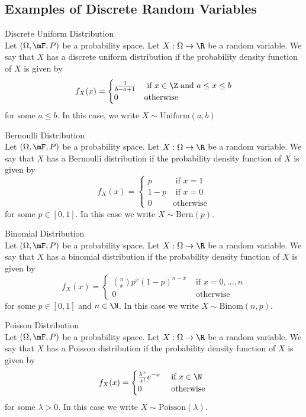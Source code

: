 \documentclass[a4paper]{article}
\begin{document}
\subsection{Examples of Discrete Random Variables}
\begin{defn}{Discrete Uniform Distribution}{}\\
Let $(\Omega,\mF,P)$ be a probability space. Let $X:\Omega\to\R$ be a random variable. We say that $X$ has a discrete uniform distribution if the probability density function of $X$ is given by $$f_X(x)=\begin{cases}
\frac{1}{b-a+1} & \text{ if }x\in\Z\text{ and }a\leq x\leq b\\
0 & \text{otherwise}
\end{cases}$$ for some $a\leq b$. In this case, we write $X\sim\text{Uniform}(a,b)$
\end{defn}

\begin{defn}{Bernoulli Distribution}{}\\
Let $(\Omega,\mF,P)$ be a probability space. Let $X:\Omega\to\R$ be a random variable. We say that $X$ has a Bernoulli distribution if the probability density function of $X$ is given by $$f_X(x)=\begin{cases}
p & \text{ if }x=1\\
1-p & \text{ if }x=0\\
0 & \text{otherwise}
\end{cases}$$ for some $p\in [0,1]$. In this case we write $X\sim\text{Bern}(p)$. 
\end{defn}

\begin{defn}{Binomial Distribution}{}\\
Let $(\Omega,\mF,P)$ be a probability space. Let $X:\Omega\to\R$ be a random variable. We say that $X$ has a binomial distribution if the probability density function of $X$ is given by $$f_X(x)=\begin{cases}
\binom{n}{x}p^x(1-p)^{n-x} & \text{ if }x=0,\dots,n\\
0 & \text{ otherwise }
\end{cases}$$ for some $p\in[0,1]$ and $n\in\N$. In this case we write $X\sim\text{Binom}(n,p)$. 
\end{defn}

\begin{defn}{Poisson Distribution}{}\\
Let $(\Omega,\mF,P)$ be a probability space. Let $X:\Omega\to\R$ be a random variable. We say that $X$ has a Poisson distribution if the probability density function of $X$ is given by $$f_X(x)=\begin{cases}
\frac{\lambda^x}{x!}e^{-x} & \text{ if }x\in\N\\
0 & \text{ otherwise }
\end{cases}$$ for some $\lambda>0$. In this case we write $X\sim\text{Poisson}(\lambda)$. 
\end{defn}
\end{document}
